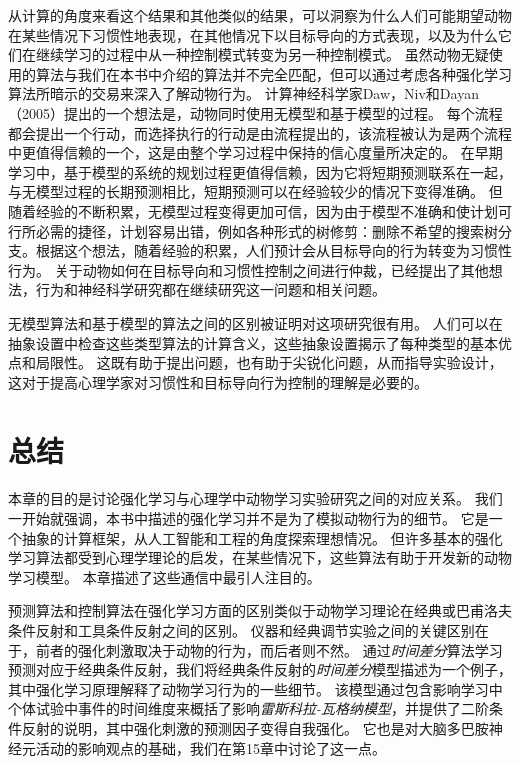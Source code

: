 {{{{{{{{{{{{{从计算的角度来看这个结果和其他类似的结果，可以洞察为什么人们可能期望动物在某些情况下习惯性地表现，在其他情况下以目标导向的方式表现，以及为什么它们在继续学习的过程中从一种控制模式转变为另一种控制模式。
虽然动物无疑使用的算法与我们在本书中介绍的算法并不完全匹配，但可以通过考虑各种强化学习算法所暗示的交易来深入了解动物行为。
计算神经科学家Daw，Niv和Dayan（2005）提出的一个想法是，动物同时使用无模型和基于模型的过程。
每个流程都会提出一个行动，而选择执行的行动是由流程提出的，该流程被认为是两个流程中更值得信赖的一个，这是由整个学习过程中保持的信心度量所决定的。
在早期学习中，基于模型的系统的规划过程更值得信赖，因为它将短期预测联系在一起，与无模型过程的长期预测相比，短期预测可以在经验较少的情况下变得准确。
但随着经验的不断积累，无模型过程变得更加可信，因为由于模型不准确和使计划可行所必需的捷径，计划容易出错，例如各种形式的树修剪：删除不希望的搜索树分支。根据这个想法，随着经验的积累，人们预计会从目标导向的行为转变为习惯性行为。
关于动物如何在目标导向和习惯性控制之间进行仲裁，已经提出了其他想法，行为和神经科学研究都在继续研究这一问题和相关问题。


无模型算法和基于模型的算法之间的区别被证明对这项研究很有用。
人们可以在抽象设置中检查这些类型算法的计算含义，这些抽象设置揭示了每种类型的基本优点和局限性。
这既有助于提出问题，也有助于尖锐化问题，从而指导实验设计，这对于提高心理学家对习惯性和目标导向行为控制的理解是必要的。


\section{总结}

本章的目的是讨论强化学习与心理学中动物学习实验研究之间的对应关系。
我们一开始就强调，本书中描述的强化学习并不是为了模拟动物行为的细节。
它是一个抽象的计算框架，从人工智能和工程的角度探索理想情况。
但许多基本的强化学习算法都受到心理学理论的启发，在某些情况下，这些算法有助于开发新的动物学习模型。
本章描述了这些通信中最引人注目的。


预测算法和控制算法在强化学习方面的区别类似于动物学习理论在经典或巴甫洛夫条件反射和工具条件反射之间的区别。
仪器和经典调节实验之间的关键区别在于，前者的强化刺激取决于动物的行为，而后者则不然。
通过\textit{时间差分}算法学习预测对应于经典条件反射，我们将经典条件反射的\textit{时间差分}模型描述为一个例子，其中强化学习原理解释了动物学习行为的一些细节。
该模型通过包含影响学习中个体试验中事件的时间维度来概括了影响\textit{雷斯科拉-瓦格纳模型}，并提供了二阶条件反射的说明，其中强化刺激的预测因子变得自我强化。
它也是对大脑多巴胺神经元活动的影响观点的基础，我们在第15章中讨论了这一点。


}}}}}}}}}}}}}
